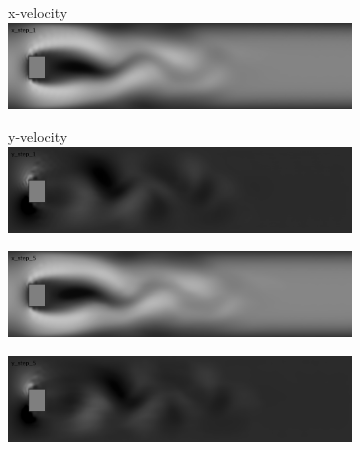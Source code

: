\documentclass{llncs}
\begin{document}
\begin{figure}[H]
  \begin{subfigure}{.5\textwidth}
    \centering
    \large{x-velocity}
    \includegraphics[width=1\linewidth]{imgs/sims/fluid/x_step_1}
  \end{subfigure}
  \begin{subfigure}{.5\textwidth}
    \centering
    \large{y-velocity}
    \includegraphics[width=1\linewidth]{imgs/sims/fluid/y_step_1}
  \end{subfigure}

  \begin{subfigure}{.5\textwidth}
    \centering
    \includegraphics[width=1\linewidth]{imgs/sims/fluid/x_step_5}
  \end{subfigure}
  \begin{subfigure}{.5\textwidth}
    \centering
    \includegraphics[width=1\linewidth]{imgs/sims/fluid/y_step_5}
  \end{subfigure}


\end{figure}
\end{document}
